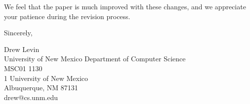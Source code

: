 \documentclass[10pt]{article}
\begin{document}
We feel that the paper is much improved with these changes, and we appreciate your patience during the revision process.

\begin{flushleft}Sincerely, \end{flushleft} 

\noindent Drew Levin \\
University of New Mexico Department of Computer Science \\
MSC01 1130 \\
1 University of New Mexico \\
Albuquerque, NM 87131 \\
drew@cs.unm.edu
\end{document}
